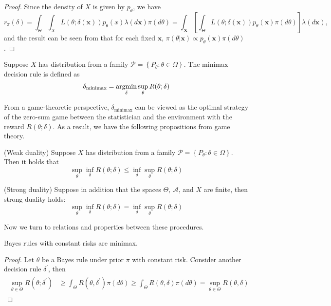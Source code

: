 \begin{proof}
    Since the density of $X$ is given by $p_\theta$, we have
    $$ 
    r_{\pi}(\delta) = \int_{\Theta} \int_{X} L(\theta; \delta(\mathbf{x})) p_{\theta}(x) \lambda(d\mathbf{x})\pi(d\theta) = \int_{\mathbf{X}} \left[ \int_{\Theta} L(\theta; \delta(\mathbf{x})) p_{\theta}(\mathbf{x}) \pi(d\theta) \right] \lambda(d\mathbf{x}),
    $$
and the result can be seen from that for each fixed $\mathbf{x}$, $\pi(\theta|\mathbf{x})\propto p_\theta(\mathbf{x})\pi(d\theta)$.
\end{proof}

\begin{de}
     Suppose $X$ has distribution from a family $\mathcal{P}=\left\{P_\theta: \theta \in \Omega\right\}$. The minimax decision rule is defined as
     \[
     \delta_{\operatorname{minimax}}=\operatornamewithlimits{argmin}_{\delta}  \sup_{\theta} R(\theta;\delta)
     \]
\end{de}

\begin{remark}
    From a game-theoretic perspective, $\delta_{\operatorname{minimax}}$ can be viewed as the optimal strategy of the zero-sum game between the statistician and the environment with the reward $R(\theta;\delta)$. As a result, we have the following propositions from game theory.
\end{remark}

\begin{prop}
    (Weak duality) Suppose $X$ has distribution from a family $\mathcal{P}=\left\{P_\theta: \theta \in \Omega\right\}$. Then it holds that
    $$
    \sup_\theta \inf_\delta R(\theta;\delta) \leq \inf_\delta \sup_\theta  R(\theta;\delta)
    $$
\end{prop}

\begin{prop}
    (Strong duality) Suppose in addition that the spaces $\Theta$, $\mathcal{A}$, and $X$ are finite, then strong duality holds:
    $$
    \sup_\theta \inf_\delta R(\theta;\delta) = \inf_\delta \sup_\theta  R(\theta;\delta)
    $$
\end{prop}

Now we turn to relations and properties between these procedures.

\begin{prop}
     Bayes rules with constant risks are minimax. 
\end{prop}

\begin{proof}
Let $\theta$ be a Bayes rule under prior $\pi$ with constant risk. Consider another decision rule $\delta^{\prime}$, then
\begin{align*}
\begin{aligned}
\sup _{\theta \in \Theta} R\left(\theta; \delta^{\prime}\right) & \geq \int_{\Theta} R\left(\theta, \delta^{\prime}\right) \pi(d \theta)\geq \int_{\Theta} R\left(\theta, \delta\right) \pi(d \theta)=\sup _{\theta \in \Theta} R(\theta, \delta)
\end{aligned}
\end{align*}
\end{proof}

